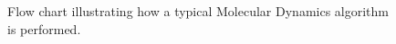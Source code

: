 \begin{figure}[h]
\centering
\caption{Flow chart illustrating how a typical Molecular Dynamics algorithm is performed.}
\label{fig:flow_simple_md}
\end{figure}
